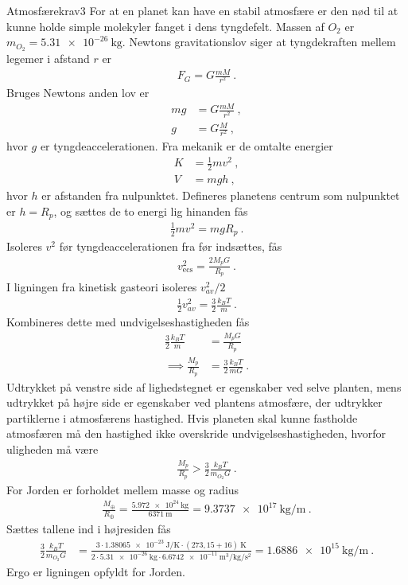 %
%
\begin{opgave}{Atmosfærekrav}{3}
For at en planet kan have en stabil atmosfære er den nød til at kunne holde simple molekyler fanget i dens tyngdefelt. Massen af $O_2$ er $m_{O_2} = \SI{5,31e-26}{\kilo\gram}$.
\opg Newtons gravitationslov siger at tyngdekraften mellem legemer i afstand $r$ er
\begin{align*}
	F_G = G\frac{mM}{r^2} \: .
\end{align*}
Bruges Newtons anden lov er
\begin{align*}
	mg &= G\frac{mM}{r^2} \: , \\
	g &= G\frac{M}{r^2} \: ,
\end{align*}
hvor $g$ er tyngdeaccelerationen.
\opg Fra mekanik er de omtalte energier
\begin{align*}
	K &= \frac{1}{2}mv^2 \: , \\
	V &= mgh \: ,
\end{align*}
hvor $h$ er afstanden fra nulpunktet. Defineres planetens centrum som nulpunktet er $h = R_p$, og sættes de to energi lig hinanden fås
\begin{align*}
	\frac{1}{2}mv^2 = mgR_p \: .
\end{align*}
Isoleres $v^2$ før tyngdeaccelerationen fra før indsættes, fås
\begin{align*}
	v_\mathrm{ecs}^2 = \frac{2M_pG}{R_p} \: .
\end{align*}
\opg I ligningen fra kinetisk gasteori isoleres $v_{av}^2/2$
\begin{align*}
	\frac{1}{2}v_{av}^2 = \frac{3}{2}\frac{k_BT}{m} \: .
\end{align*}
Kombineres dette med undvigelseshastigheden fås
\begin{align*}
	\frac{3}{2}\frac{k_BT}{m} &= \frac{M_pG}{R_p} \\
	\implies \frac{M_p}{R_p} &= \frac{3}{2}\frac{k_BT}{mG} \: .
\end{align*}
\opg Udtrykket på venstre side af lighedstegnet er egenskaber ved selve planten, mens udtrykket på højre side er egenskaber ved plantens atmosfære, der udtrykker partiklerne i atmosfærens hastighed. Hvis planeten skal kunne fastholde atmosfæren må den hastighed ikke overskride undvigelseshastigheden, hvorfor uligheden må være
\begin{align}
	\frac{M_p}{R_p} > \frac{3}{2}\frac{k_BT}{m_{O_2}G} \: .
\end{align}
\opg For Jorden er forholdet mellem masse og radius
\begin{align*}
	\frac{M_\oplus}{R_\oplus} = \frac{\SI{5,972e24}{\kilo\gram}}{\SI{6371}{\metre}} = \SI{9.3737e+17}{\kilo\gram\per\metre} \: .
\end{align*}
Sættes tallene ind i højresiden fås
\begin{align*}
	\frac{3}{2}\frac{k_BT}{m_{O_2}G} &= \frac{3\cdot\SI{1.38065e-23}{\joule\per\kelvin}\cdot(273,15 + 16)\SI{}{\kelvin}}{2\cdot\SI{5,31e-26}{\kilo\gram}\cdot\SI{6.6742e-11}{\metre\cubed\per\kilo\gram\per\second\squared}} = \SI{1.6886e+15}{\kilo\gram\per\metre} \: .
\end{align*}
Ergo er ligningen opfyldt for Jorden.
\end{opgave}
